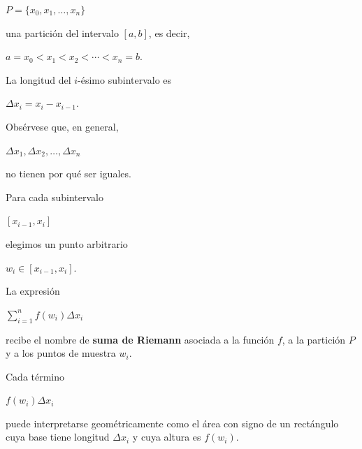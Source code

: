 \documentclass[12pt]{article}
\begin{document}
$
P=\{x_0,x_1,\ldots,x_n\}
$

una partición del intervalo $[a,b]$, es decir,

$
a=x_0<x_1<x_2<\cdots<x_n=b.
$

La longitud del $i$-ésimo subintervalo es

$
\Delta x_i=x_i-x_{i-1}.
$

Obsérvese que, en general,

$
\Delta x_1,\Delta x_2,\ldots,\Delta x_n
$

no tienen por qué ser iguales.

Para cada subintervalo

$
[x_{i-1},x_i]
$

elegimos un punto arbitrario

$
w_i\in[x_{i-1},x_i].
$

La expresión

$
\boxed{
\sum_{i=1}^{n}f(w_i)\Delta x_i
}
$

recibe el nombre de \textbf{suma de Riemann} asociada a la función
$f$, a la partición $P$ y a los puntos de muestra $w_i$.

Cada término

$
f(w_i)\Delta x_i
$

puede interpretarse geométricamente como el área con signo de un
rectángulo cuya base tiene longitud $\Delta x_i$ y cuya altura es
$f(w_i)$.

\end{document}
